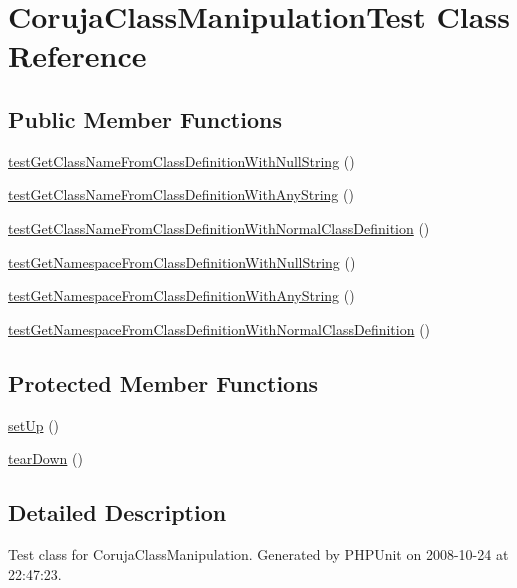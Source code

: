 \hypertarget{class_coruja_class_manipulation_test}{
\section{CorujaClassManipulationTest Class Reference}
\label{class_coruja_class_manipulation_test}
}
\subsection*{Public Member Functions}
\begin{CompactItemize}
\item 
\hyperlink{class_coruja_class_manipulation_test_597f3fd79250591e51a07532b84520fa}{testGetClassNameFromClassDefinitionWithNullString} ()
\item 
\hyperlink{class_coruja_class_manipulation_test_ff7a03d9aea2786f8cb04b38b194b53f}{testGetClassNameFromClassDefinitionWithAnyString} ()
\item 
\hyperlink{class_coruja_class_manipulation_test_922c39d49268128861fac863098fb660}{testGetClassNameFromClassDefinitionWithNormalClassDefinition} ()
\item 
\hyperlink{class_coruja_class_manipulation_test_ce9cf206ad48a158cd897305919b68cf}{testGetNamespaceFromClassDefinitionWithNullString} ()
\item 
\hyperlink{class_coruja_class_manipulation_test_53d2c075bd350927691fcd7171e6cf44}{testGetNamespaceFromClassDefinitionWithAnyString} ()
\item 
\hyperlink{class_coruja_class_manipulation_test_4bc6c516b02ff2e92a533a1ed066ccbf}{testGetNamespaceFromClassDefinitionWithNormalClassDefinition} ()
\end{CompactItemize}
\subsection*{Protected Member Functions}
\begin{CompactItemize}
\item 
\hyperlink{class_coruja_class_manipulation_test_0689ef78070e399d14d8152d797ad32f}{setUp} ()
\item 
\hyperlink{class_coruja_class_manipulation_test_bb345ca2d0b9f7c3525edbc0f3ace254}{tearDown} ()
\end{CompactItemize}


\subsection{Detailed Description}
Test class for CorujaClassManipulation. Generated by PHPUnit on 2008-10-24 at 22:47:23. 

